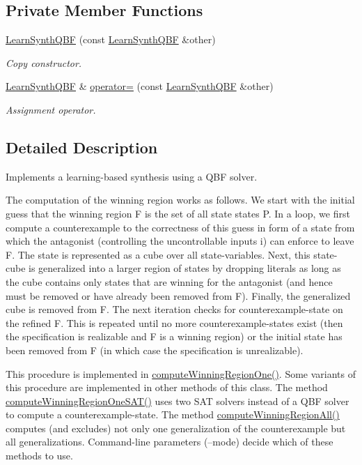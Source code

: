 \subsection*{Private Member Functions}
\begin{DoxyCompactItemize}
\item 
\hyperlink{classLearnSynthQBF_ad8d67501811be3fc0366e19df7f8d10a}{Learn\-Synth\-Q\-B\-F} (const \hyperlink{classLearnSynthQBF}{Learn\-Synth\-Q\-B\-F} \&other)
\begin{DoxyCompactList}\small\item\em Copy constructor. \end{DoxyCompactList}\item 
\hyperlink{classLearnSynthQBF}{Learn\-Synth\-Q\-B\-F} \& \hyperlink{classLearnSynthQBF_a143bc7b32f7511ddbdbdec01c2e43578}{operator=} (const \hyperlink{classLearnSynthQBF}{Learn\-Synth\-Q\-B\-F} \&other)
\begin{DoxyCompactList}\small\item\em Assignment operator. \end{DoxyCompactList}\end{DoxyCompactItemize}


\subsection{Detailed Description}
Implements a learning-\/based synthesis using a Q\-B\-F solver. 

The computation of the winning region works as follows. We start with the initial guess that the winning region F is the set of all state states P. In a loop, we first compute a counterexample to the correctness of this guess in form of a state from which the antagonist (controlling the uncontrollable inputs i) can enforce to leave F. The state is represented as a cube over all state-\/variables. Next, this state-\/cube is generalized into a larger region of states by dropping literals as long as the cube contains only states that are winning for the antagonist (and hence must be removed or have already been removed from F). Finally, the generalized cube is removed from F. The next iteration checks for counterexample-\/state on the refined F. This is repeated until no more counterexample-\/states exist (then the specification is realizable and F is a winning region) or the initial state has been removed from F (in which case the specification is unrealizable).

This procedure is implemented in \hyperlink{classLearnSynthQBF_ac538cd53082bad1c8c45a7e178dfa4cb}{compute\-Winning\-Region\-One()}. Some variants of this procedure are implemented in other methods of this class. The method \hyperlink{classLearnSynthQBF_af8c897056a5018ff1717ea2d76f6cd8f}{compute\-Winning\-Region\-One\-S\-A\-T()} uses two S\-A\-T solvers instead of a Q\-B\-F solver to compute a counterexample-\/state. The method \hyperlink{classLearnSynthQBF_a09a9ecb2b77c540cdcc327a35cd15c18}{compute\-Winning\-Region\-All()} computes (and excludes) not only one generalization of the counterexample but all generalizations. Command-\/line parameters (--mode) decide which of these methods to use.

